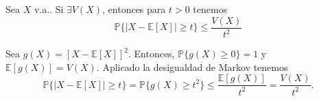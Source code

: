 \begin{theo}
  Sea $X$ v.a.. Si $\exists V(X)$, entonces para $t>0$ tenemos
  \[ 
    \mathbb{P} \{ | X - \mathbb{E} [ X ] | \geq t \} \leq \frac{V(X)}{t^{2}} 
  \] 
\end{theo}

\begin{dem}
  Sea $g(X) = [ X - \mathbb{E} [ X ] ]^{2}$. Entonces, $\mathbb{P} \{ g(X) \geq  0\} = 1$ y $\mathbb{E} [ g(X) ] = V(X)$. Aplicado la desigualdad de Markov tenemos
  \[ 
    \mathbb{P} \{ | X - \mathbb{E} [ X ] | \geq t \} = \mathbb{P} \{ g(X) \geq t^{2} \} \leq \frac{\mathbb{E} [ g(X) ]}{t^{2}}  = \frac{V(X)}{t^{2}}.
  \] 
\end{dem}
